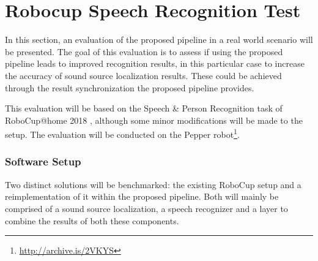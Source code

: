 
\section{Robocup Speech Recognition Test}
\label{eval:task_start}
In this section, an evaluation of the proposed pipeline in a real world scenario will be presented.
The goal of this evaluation is to assess if using the proposed pipeline leads to improved recognition results, in this particular case to increase the accuracy of sound source localization results.
These could be achieved through the result synchronization the proposed pipeline provides.

This evaluation will be based on the Speech \& Person Recognition task of RoboCup@home 2018 \cite{rulebook_2018}, although some minor modifications will be made to the setup.
The evaluation will be conducted on the Pepper robot\footnote{\url{http://archive.is/2VKYS}}.

\subsubsection{Software Setup}
Two distinct solutions will be benchmarked:
the existing RoboCup setup and a reimplementation of it within the proposed pipeline.
Both will mainly be comprised of a sound source localization, a speech recognizer and a layer to combine the results of both these components.

